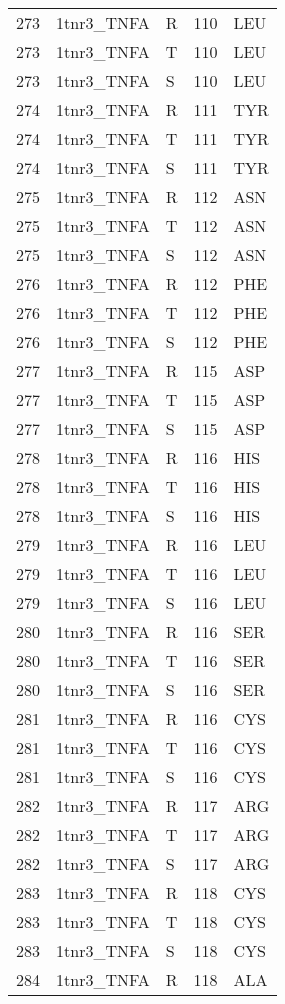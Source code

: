 \begin{tiny}
\begin{longtable}[l]{l|l|l|l|l}
	273 & 1tnr3\_TNFA & R & 110 & LEU \\
	273 & 1tnr3\_TNFA & T & 110 & LEU \\
	273 & 1tnr3\_TNFA & S & 110 & LEU \\
	274 & 1tnr3\_TNFA & R & 111 & TYR \\
	274 & 1tnr3\_TNFA & T & 111 & TYR \\
	274 & 1tnr3\_TNFA & S & 111 & TYR \\
	275 & 1tnr3\_TNFA & R & 112 & ASN \\
	275 & 1tnr3\_TNFA & T & 112 & ASN \\
	275 & 1tnr3\_TNFA & S & 112 & ASN \\
	276 & 1tnr3\_TNFA & R & 112 & PHE \\
	276 & 1tnr3\_TNFA & T & 112 & PHE \\
	276 & 1tnr3\_TNFA & S & 112 & PHE \\
	277 & 1tnr3\_TNFA & R & 115 & ASP \\
	277 & 1tnr3\_TNFA & T & 115 & ASP \\
	277 & 1tnr3\_TNFA & S & 115 & ASP \\
	278 & 1tnr3\_TNFA & R & 116 & HIS \\
	278 & 1tnr3\_TNFA & T & 116 & HIS \\
	278 & 1tnr3\_TNFA & S & 116 & HIS \\
	279 & 1tnr3\_TNFA & R & 116 & LEU \\
	279 & 1tnr3\_TNFA & T & 116 & LEU \\
	279 & 1tnr3\_TNFA & S & 116 & LEU \\
	280 & 1tnr3\_TNFA & R & 116 & SER \\
	280 & 1tnr3\_TNFA & T & 116 & SER \\
	280 & 1tnr3\_TNFA & S & 116 & SER \\
	281 & 1tnr3\_TNFA & R & 116 & CYS \\
	281 & 1tnr3\_TNFA & T & 116 & CYS \\
	281 & 1tnr3\_TNFA & S & 116 & CYS \\
	282 & 1tnr3\_TNFA & R & 117 & ARG \\
	282 & 1tnr3\_TNFA & T & 117 & ARG \\
	282 & 1tnr3\_TNFA & S & 117 & ARG \\
	283 & 1tnr3\_TNFA & R & 118 & CYS \\
	283 & 1tnr3\_TNFA & T & 118 & CYS \\
	283 & 1tnr3\_TNFA & S & 118 & CYS \\
	284 & 1tnr3\_TNFA & R & 118 & ALA \\

\end{longtable}
\end{tiny}
